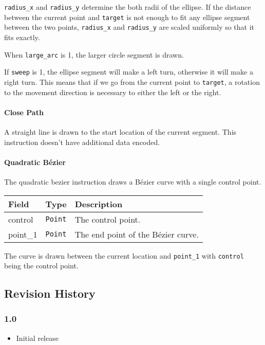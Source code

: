 \documentclass[]{article}
\providecommand{\tightlist}{%
  \setlength{\itemsep}{0pt}\setlength{\parskip}{0pt}}
\begin{document}
\texttt{radius\_x} and \texttt{radius\_y} determine the both radii of
the ellipse. If the distance between the current point and
\texttt{target} is not enough to fit any ellipse segment between the two
points, \texttt{radius\_x} and \texttt{radius\_y} are scaled uniformly
so that it fits exactly.

When \texttt{large\_arc} is 1, the larger circle segment is drawn.

If \texttt{sweep} is 1, the ellipse segment will make a left turn,
otherwise it will make a right turn. This means that if we go from the
current point to \texttt{target}, a rotation to the movement direction
is necessary to either the left or the right.

\hypertarget{close-path}{%
\paragraph{Close Path}\label{close-path}}

A straight line is drawn to the start location of the current segment.
This instruction doesn't have additional data encoded.

\hypertarget{quadratic-bezier}{%
\paragraph{Quadratic Bézier}\label{quadratic-bezier}}

The quadratic bezier instruction draws a Bézier curve with a single
control point.

\begin{longtable}[]{@{}p{1in}p{2in}p{3in}@{}}
\toprule
Field & Type & Description \\
\midrule
\endhead
control & \texttt{Point} & The control point. \\
point\_1 & \texttt{Point} & The end point of the Bézier curve. \\
\bottomrule
\end{longtable}

The curve is drawn between the current location and \texttt{point\_1}
with \texttt{control} being the control point.

\hypertarget{revision-history}{%
\subsection{Revision History}\label{revision-history}}

\hypertarget{10}{%
\subsubsection{1.0}\label{10}}

\begin{itemize}
\tightlist
\item
  Initial release
\end{itemize}
\end{document}
